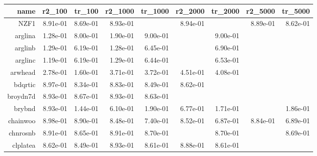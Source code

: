 \begin{tabular}{rrrrrrrrr}
  \hline
  \textbf{name} & \textbf{r2\_100} & \textbf{tr\_100} & \textbf{r2\_1000} & \textbf{tr\_1000} & \textbf{r2\_2000} & \textbf{tr\_2000} & \textbf{r2\_5000} & \textbf{tr\_5000} \\\hline
  NZF1 &  8.91e-01 &  8.69e-01 &  8.93e-01 & \cellcolor{black}{\color{white}{ 8.67e-01}} &  8.94e-01 & \cellcolor{black}{\color{white}{ 8.61e-01}} &  8.89e-01 &  8.62e-01 \\
  arglina &  1.28e-01 &  8.00e-01 &  1.90e-01 &  9.00e-01 & \cellcolor{black}{\color{white}{ 2.57e-01}} &  9.00e-01 & \cellcolor{black}{\color{white}{ 9.00e-01}} & \cellcolor{black}{\color{white}{ 9.00e-01}} \\
  arglinb &  1.29e-01 &  6.19e-01 &  1.28e-01 &  6.45e-01 & \cellcolor{black}{\color{white}{ 2.10e-01}} &  6.90e-01 & \cellcolor{black}{\color{white}{ 9.00e-01}} & \cellcolor{black}{\color{white}{ 9.00e-01}} \\
  arglinc &  1.19e-01 &  6.19e-01 &  1.29e-01 &  6.44e-01 & \cellcolor{black}{\color{white}{ 2.89e-01}} &  6.53e-01 & \cellcolor{black}{\color{white}{ 9.00e-01}} & \cellcolor{black}{\color{white}{ 9.00e-01}} \\
  arwhead &  2.78e-01 &  1.60e-01 &  3.71e-01 &  3.72e-01 &  4.51e-01 &  4.08e-01 & \cellcolor{black}{\color{white}{ 7.22e-01}} & \cellcolor{black}{\color{white}{ 3.18e-01}} \\
  bdqrtic &  8.97e-01 &  8.34e-01 &  8.83e-01 &  8.49e-01 &  8.62e-01 & \cellcolor{black}{\color{white}{ 8.35e-01}} & \cellcolor{black}{\color{white}{ 7.49e-01}} & \cellcolor{black}{\color{white}{ 8.44e-01}} \\
  broydn7d &  8.93e-01 &  8.67e-01 &  8.93e-01 &  8.63e-01 & \cellcolor{black}{\color{white}{ 8.93e-01}} & \cellcolor{black}{\color{white}{ 8.63e-01}} & \cellcolor{black}{\color{white}{ 8.96e-01}} & \cellcolor{black}{\color{white}{ 8.86e-01}} \\
  brybnd &  8.93e-01 &  1.44e-01 &  6.10e-01 &  1.90e-01 &  6.77e-01 &  1.71e-01 & \cellcolor{black}{\color{white}{ 1.49e-01}} &  1.86e-01 \\
  chainwoo &  8.98e-01 &  8.90e-01 &  8.48e-01 &  7.40e-01 &  8.52e-01 &  6.87e-01 &  8.84e-01 &  6.89e-01 \\
  chnrosnb &  8.91e-01 &  8.65e-01 &  8.91e-01 &  8.70e-01 & \cellcolor{black}{\color{white}{ 8.91e-01}} &  8.70e-01 & \cellcolor{black}{\color{white}{ 8.91e-01}} &  8.69e-01 \\
  clplatea &  8.62e-01 &  8.49e-01 &  8.93e-01 &  8.61e-01 &  8.88e-01 &  8.61e-01 & \cellcolor{black}{\color{white}{ 8.93e-01}} & \cellcolor{black}{\color{white}{ 8.69e-01}} \\

\end{tabular}
